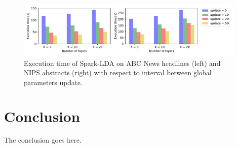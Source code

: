 \documentclass[journal]{IEEEtran}
\begin{document}
\begin{figure}[t]
\centering
\includegraphics[scale=0.7]{plots/param_update.pdf}
\caption{Execution time of Spark-LDA on ABC News headlines (left) and NIPS abstracts (right) with respect to interval between global parameters update.}
\label{fig_sim}
\end{figure}



\section{Conclusion}
The conclusion goes here.








\end{document}
